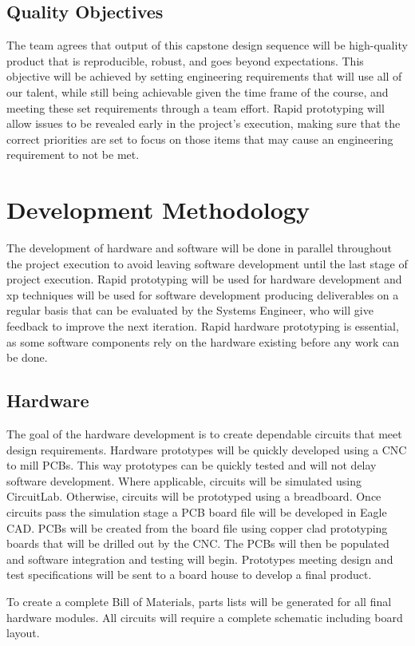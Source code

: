 \subsection{Quality Objectives}
The team agrees that output of this capstone design sequence will be high-quality product that is reproducible, robust, and goes beyond expectations.
This objective will be achieved by setting engineering requirements that will use all of our talent, while still being achievable given the time frame of the course, and meeting these set requirements through a team effort.
Rapid prototyping will allow issues to be revealed early in the project's execution, making sure that the correct priorities are set to focus on those items that may cause an engineering requirement to not be met.

\section{Development Methodology}
The development of hardware and software will be done in parallel throughout the project execution to avoid leaving software development until the last stage of project execution. 
Rapid prototyping will be used for hardware development and \gls{xp} techniques will be used for software development producing deliverables on a regular basis that can be evaluated by the Systems Engineer, who will give feedback to improve the next iteration. 
Rapid hardware prototyping is essential, as some software components rely on the hardware existing before any work can be done.
\subsection{Hardware}
The goal of the hardware development is to create dependable circuits that meet design requirements.
Hardware prototypes will be quickly developed using a CNC to mill PCBs.
This way prototypes can be quickly tested and will not delay software development.
Where applicable, circuits will be simulated using CircuitLab.
Otherwise, circuits will be prototyped using a breadboard.
Once circuits pass the simulation stage a PCB board file will be developed in Eagle CAD.
PCBs will be created from the board file using copper clad prototyping boards that will be drilled out by the CNC.
The PCBs will then be populated and software integration and testing will begin.
Prototypes meeting design and test specifications will be sent to a board house to develop a final product.

To create a complete Bill of Materials, parts lists will be generated for all final hardware modules.
All circuits will require a complete schematic including board layout. 

